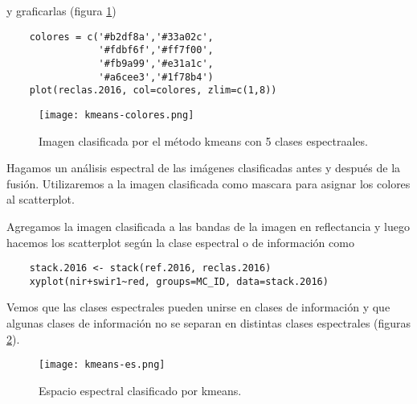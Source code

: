\begin{exa}
  y graficarlas (figura \ref{fig:kmean5})

  \begin{lstlisting}
    colores = c('#b2df8a','#33a02c',
                '#fdbf6f','#ff7f00',
                '#fb9a99','#e31a1c',
                '#a6cee3','#1f78b4')
    plot(reclas.2016, col=colores, zlim=c(1,8))
  \end{lstlisting}
  \begin{figure}[h!]
    \centering
    \texttt{[image: kmeans-colores.png]}
    \caption{Imagen clasificada por el m\'etodo kmeans con 5 clases espectraales.}
    \label{fig:kmean5}
  \end{figure}
\end{exa}

\begin{exa}
  Hagamos un an\'alisis espectral de las im\'agenes clasificadas antes y despu\'es de la fusi\'on.  Utilizaremos a la imagen clasificada como mascara para asignar los colores  al scatterplot.

  Agregamos la imagen clasificada a las bandas de la imagen en reflectancia y luego hacemos los scatterplot seg\'un la clase espectral o de informaci\'on como

  \begin{lstlisting}
    stack.2016 <- stack(ref.2016, reclas.2016)
    xyplot(nir+swir1~red, groups=MC_ID, data=stack.2016)
  \end{lstlisting}

  Vemos que las clases espectrales pueden unirse en clases de informaci\'on y que algunas clases de informaci\'on no se separan en distintas clases espectrales (figuras \ref{fig:esk}).

  \begin{figure}[h!]
    \centering
    \texttt{[image: kmeans-es.png]}
    \caption{Espacio espectral clasificado por kmeans.}
    \label{fig:esk}
  \end{figure}

\end{exa}

